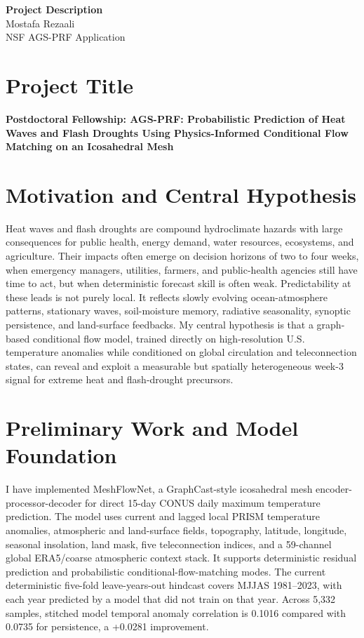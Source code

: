 \documentclass[11pt,letterpaper]{article}
\begin{document}
\begin{center}
{\Large\bfseries Project Description}\\[0.05in]
{\normalsize Mostafa Rezaali}\\
{\normalsize NSF AGS-PRF Application}
\end{center}
\vspace{-0.08in}
\section*{Project Title}
\textbf{Postdoctoral Fellowship: AGS-PRF: Probabilistic Prediction of Heat Waves and Flash Droughts Using Physics-Informed Conditional Flow Matching on an Icosahedral Mesh}

\section*{Motivation and Central Hypothesis}
Heat waves and flash droughts are compound hydroclimate hazards with large consequences for public health, energy demand, water resources, ecosystems, and agriculture. Their impacts often emerge on decision horizons of two to four weeks, when emergency managers, utilities, farmers, and public-health agencies still have time to act, but when deterministic forecast skill is often weak. Predictability at these leads is not purely local. It reflects slowly evolving ocean-atmosphere patterns, stationary waves, soil-moisture memory, radiative seasonality, synoptic persistence, and land-surface feedbacks. My central hypothesis is that a graph-based conditional flow model, trained directly on high-resolution U.S. temperature anomalies while conditioned on global circulation and teleconnection states, can reveal and exploit a measurable but spatially heterogeneous week-3 signal for extreme heat and flash-drought precursors.

\section*{Preliminary Work and Model Foundation}
I have implemented MeshFlowNet, a GraphCast-style icosahedral mesh encoder-processor-decoder for direct 15-day CONUS daily maximum temperature prediction. The model uses current and lagged local PRISM temperature anomalies, atmospheric and land-surface fields, topography, latitude, longitude, seasonal insolation, land mask, five teleconnection indices, and a 59-channel global ERA5/coarse atmospheric context stack. It supports deterministic residual prediction and probabilistic conditional-flow-matching modes. The current deterministic five-fold leave-years-out hindcast covers MJJAS 1981--2023, with each year predicted by a model that did not train on that year. Across 5,332 samples, stitched model temporal anomaly correlation is 0.1016 compared with 0.0735 for persistence, a +0.0281 improvement.
\end{document}
